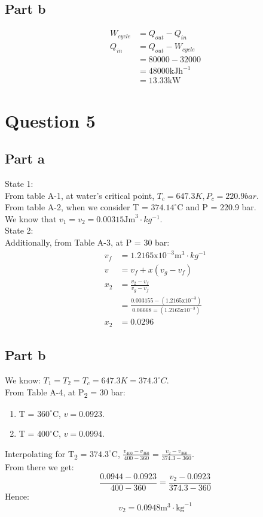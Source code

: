 \subsection{Part b}
\begin{equation*}
    \begin{split}
        W_{cycle} & = Q_{out} - Q_{in} \\
        Q_{in} & = Q_{out} - W_{cycle} \\
        & = 80000 - 32000 \\
        & = 48000 \text{kJh}^{-1} \\
        & = 13.33 \text{kW}
    \end{split}
\end{equation*}

\section{Question 5}
\subsection{Part a}
State 1: \\
From table A-1, at water's critical point, $T_c = 647.3K, P_c = 220.9bar$. \\
From table A-2, when we consider T = $374.14^\circ$C and P = 220.9 bar. \\
We know that $v_1 = v_2 = 0.00315\text{Jm}^3 \cdot kg^{-1}$. \\
State 2: \\
Additionally, from Table A-3, at P = 30 bar: \\
\begin{equation*}
    \begin{split}
        v_f & = 1.2165\text{x}10^{-3}\text{m}^3\cdot kg^{-1} \\
        v & = v_f + x(v_g - v_f) \\
        x_2 & = \frac{v_2 - v_f}{v_g - v_f} \\
        & = \frac{0.003155 - (1.2165\text{x}10^{-3})}{0.06668 = (1.2165\text{x}10^{-3})} \\
        x_2 & = 0.0296
    \end{split}
\end{equation*}
\subsection{Part b}
We know: $T_1 = T_2 = T_c = 647.3K = 374.3^\circ C$. \\
From Table A-4, at P\textsubscript{2} = 30 bar: \\
\begin{enumerate}
    \item T = $360^\circ$C, $v = 0.0923$.
    \item T = $400^\circ$C, $v = 0.0994$.
\end{enumerate}
Interpolating for T\textsubscript{2} = $374.3^\circ$C, $\frac{v_{400}-v_{360}}{400-360} = \frac{v_2 - v_{360}}{374.3-360}$. \\
From there we get: $$\frac{0.0944 - 0.0923}{400-360} = \frac{v_2 - 0.0923}{374.3 - 360}$$
Hence:
$$
v_2 = 0.0948\text{m}^3 \cdot \text{kg}^{-1}
$$